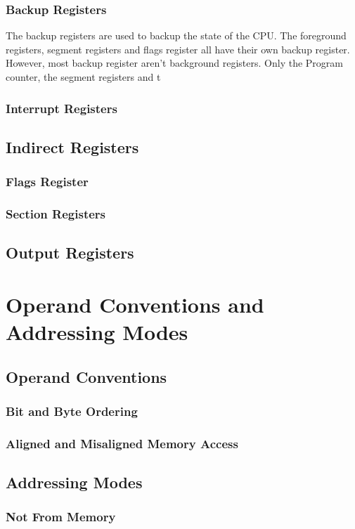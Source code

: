 \documentclass[oneside, a4paper]{memoir}
\begin{document}
\subsection{Backup Registers}
The backup registers are used to backup the state of the CPU. The foreground registers, segment registers and flags register all have their own backup register. However, most backup register aren't background registers. Only the Program counter, the segment registers and t 
\subsection{Interrupt Registers}
\section{Indirect Registers}
\subsection{Flags Register}
\subsection{Section Registers}
\section{Output Registers}

\chapter{Operand Conventions and Addressing Modes}
\section{Operand Conventions}
\subsection{Bit and Byte Ordering}
\subsection{Aligned and Misaligned Memory Access}
\section{Addressing Modes}
\subsection{Not From Memory}
\end{document}
